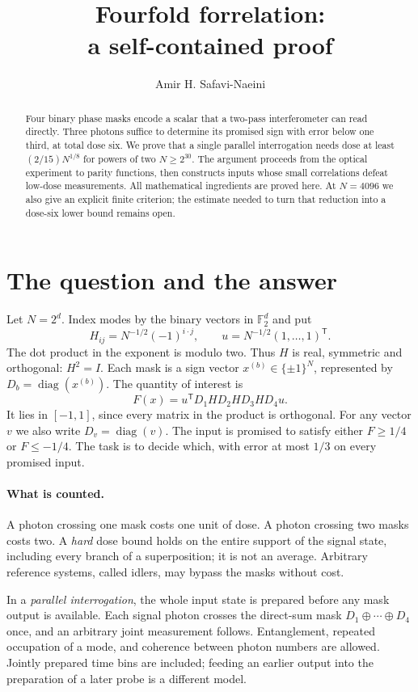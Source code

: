 \documentclass[11pt]{article}
\title{Fourfold forrelation:\\a self-contained proof}
\author{Amir H. Safavi-Naeini}
\date{}
\newcommand{\diag}{\operatorname{diag}}
\newcommand{\1}{\mathbf 1}
\begin{document}
\maketitle
\begin{abstract}
Four binary phase masks encode a scalar that a two-pass interferometer
can read directly. Three photons suffice to determine its promised sign
with error below one third, at total dose six. We prove that a single
parallel interrogation needs dose at least $(2/15)N^{1/8}$ for powers of
two $N\ge2^{30}$. The argument proceeds from the optical experiment to
parity functions, then constructs inputs whose small correlations defeat
low-dose measurements. All mathematical ingredients are proved here.
At $N=4096$ we also give an explicit finite criterion; the estimate needed
to turn that reduction into a dose-six lower bound remains open.
\end{abstract}

\section{The question and the answer}
Let $N=2^d$. Index modes by the binary vectors in $\mathbb F_2^d$ and put
\[
 H_{ij}=N^{-1/2}(-1)^{i\cdot j},\qquad
 u=N^{-1/2}(1,\ldots,1)^{\mathsf T}.
\]
The dot product in the exponent is modulo two. Thus $H$ is real,
symmetric and orthogonal: $H^2=I$. Each mask is a sign vector
$x^{(b)}\in\{\pm1\}^N$, represented by $D_b=\diag(x^{(b)})$.
The quantity of interest is
\begin{equation}\label{eq:forrelation}
 F(x)=u^{\mathsf T}D_1HD_2HD_3HD_4u.
\end{equation}
It lies in $[-1,1]$, since every matrix in the product is orthogonal.
For any vector $v$ we also write $D_v=\diag(v)$.
The input is promised to satisfy either $F\ge1/4$ or $F\le-1/4$.
The task is to decide which, with error at most $1/3$ on every promised input.

\paragraph{What is counted.}
A photon crossing one mask costs one unit of dose. A photon crossing
two masks costs two. A \emph{hard} dose bound holds on the entire support
of the signal state, including every branch of a superposition; it is
not an average. Arbitrary reference systems, called idlers, may bypass
the masks without cost.

In a \emph{parallel interrogation}, the whole input state is prepared
before any mask output is available. Each signal photon crosses the
direct-sum mask $D_1\oplus\cdots\oplus D_4$ once, and an arbitrary joint
measurement follows. Entanglement, repeated occupation of a mode, and
coherence between photon numbers are allowed. Jointly prepared time bins
are included; feeding an earlier output into the preparation of a later
probe is a different model.
\end{document}
